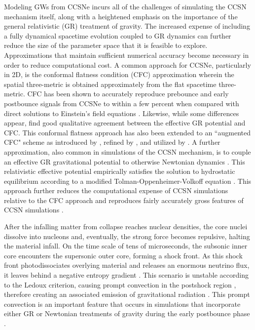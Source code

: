 \documentclass[twocolumn,times]{aastex62}  %
\begin{document}
Modeling GWs from CCSNe incurs all of the challenges of simulating the CCSN mechanism itself, along with a heightened emphasis on the importance of the general relativistic (GR) treatment of gravity. 
The increased expense of including a fully dynamical spacetime evolution coupled to GR dynamics \citep[see][]{ott:2009, ott:2012} can further reduce the size of the parameter space that it is feasible to explore. 
Approximations that maintain sufficient numerical accuracy become necessary in order to reduce computational cost.  
A common approach for CCSNe, particularly in 2D, is the conformal flatness condition (CFC) approximation wherein the spatial three-metric is obtained approximately from the flat spacetime three-metric.
CFC has been shown to accurately reproduce prebounce and early postbounce signals from CCSNe to within a few percent when compared with direct solutions to Einstein's field equations  \citep{ott:2007}.  Likewise, while some differences appear, \citet{shibata:2004} find good qualitative agreement between the effective GR potential and CFC.  This conformal flatness approach has also been extended to an ``augmented CFC" scheme as introduced by \citet{saijo:2004}, refined by \citet{cordero-carrion:2009}, and utilized by \citet{bmuller:2019}.
A further approximation, also common in simulations of the CCSN mechanism, is to couple an effective GR gravitational potential to otherwise Newtonian dynamics \citep{rampp:2002, marek:2006, bruenn:2016,  moro:2018, oconnor:2018}.  
This relativistic effective potential empirically satisfies the solution to hydrostatic equilibrium according to a modified Tolman-Oppenheimer-Volkoff equation \citep{rampp:2002, marek:2006}.
This approach further reduces the computational expense of CCSN simulations relative to the CFC approach and reproduces fairly accurately gross features of CCSN simulations \citep{marek:2006, muller:2012,oconnor:2018}.  

After the infalling matter from collapse reaches nuclear densities, the core nuclei dissolve into nucleons and, eventually, the strong force becomes repulsive, halting the material infall.  On the time scale of tens of microseconds, the subsonic inner core encounters the supersonic outer core, forming a shock front.  As this shock front photodissociates overlying material and releases an enormous neutrino flux, it leaves behind a negative entropy gradient \citep{mazurek:1982,bruenn:1985,bruenn:1989}.  This scenario is unstable according to the Ledoux criterion, causing prompt convection in the postshock region \citep{burrows:1992}, therefore creating an associated emission of gravitational radiation \citep{marek:2009b,ott:2009}.  This prompt convection is an important feature that occurs in simulations that incorporate either GR or Newtonian treatments of gravity during the early postbounce phase \citep{muller:2017,richers:2017,nagakura:2018}.
\end{document}
